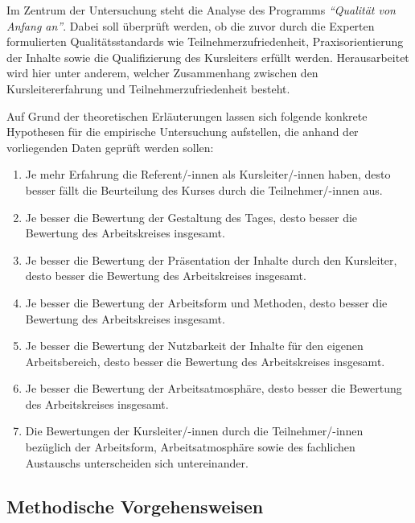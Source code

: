 \documentclass[12pt,a4paper]{article}
\begin{document}
Im Zentrum der Untersuchung steht die Analyse des Programms\textit{ "`Qualität von Anfang an"'}. Dabei soll überprüft werden, ob die zuvor durch die Experten formulierten Qualitätsstandards wie Teilnehmerzufriedenheit, Praxisorientierung der Inhalte sowie die Qualifizierung des Kursleiters erfüllt werden. Herausarbeitet wird hier unter anderem, welcher Zusammenhang zwischen den Kursleitererfahrung und Teilnehmerzufriedenheit besteht.

Auf Grund der theoretischen Erläuterungen lassen sich folgende konkrete Hypothesen für die empirische Untersuchung aufstellen, die anhand der vorliegenden Daten geprüft werden sollen:


\begin{enumerate}
\itshape
\item Je mehr Erfahrung die Referent/-innen als Kursleiter/-innen haben, desto besser fällt die Beurteilung des Kurses durch die Teilnehmer/-innen aus.

\item Je besser die Bewertung der Gestaltung des Tages, desto besser die Bewertung des Arbeitskreises insgesamt.

\item Je besser die Bewertung der Präsentation der Inhalte durch den Kursleiter, desto besser die Bewertung des Arbeitskreises insgesamt.

\item Je besser die Bewertung der Arbeitsform und Methoden, desto besser die Bewertung des Arbeitskreises insgesamt.

\item Je besser die Bewertung der Nutzbarkeit der Inhalte für den eigenen Arbeitsbereich, desto besser die Bewertung des Arbeitskreises insgesamt.

\item Je besser die Bewertung der Arbeitsatmosphäre, desto besser die Bewertung des Arbeitskreises insgesamt.

\item Die Bewertungen der Kursleiter/-innen durch die Teilnehmer/-innen bezüglich der Arbeitsform, Arbeitsatmosphäre sowie des fachlichen Austauschs unterscheiden sich untereinander.
\end{enumerate}

\normalfont

\subsection{Methodische Vorgehensweisen}
\end{document}
